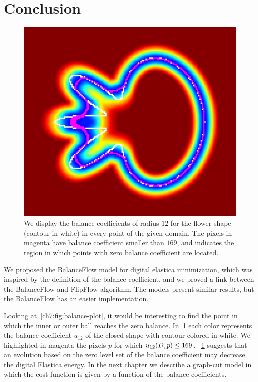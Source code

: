 \section{Conclusion}
\begin{figure}
\center
\includegraphics[scale=0.05]{figures/chapter7/level-set/flower.pdf}
\caption{ We display the balance coefficients of radius $12$ for the flower shape (contour in white) in every point of the given domain. The pixels in magenta have balance coefficient smaller than $169$, and indicates the region in which points with zero balance coefficient are located.  }
\label{ch7:fig:flower-balance-coefficient-zero-set}
\end{figure}

We proposed the BalanceFlow model for digital elastica minimization, which was inspired by the definition of the balance coefficient, and we proved a link between the BalanceFlow and FlipFlow algorithm. The models present similar results, but the BalanceFlow has an easier implementation.  

Looking at~\cref{ch7:fig:balance-plot}, it would be interesting to find the point in which the inner or outer ball reaches the zero balance. In~\cref{ch7:fig:flower-balance-coefficient-zero-set} each color represents the balance coefficient $u_{12}$ of the closed shape with contour colored in white. We highlighted in magenta the pixels $p$ for which $u_{12}(D,p) \leq 169$. ~\cref{ch7:fig:flower-balance-coefficient-zero-set} suggests that an evolution based on the zero level set of the balance coefficient may decrease the digital Elastica energy. In the next chapter we describe a graph-cut model in which the cost function is given by a function of the balance coefficients.




